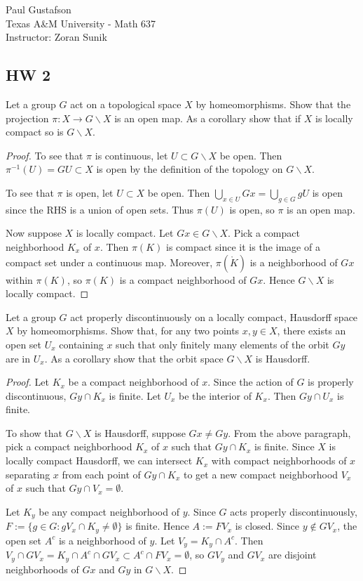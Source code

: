 \documentclass{article}
\begin{document}
\noindent Paul Gustafson\\
\noindent Texas A\&M University - Math 637\\ 
\noindent Instructor: Zoran Sunik

\subsection*{HW 2}
 Let a group $G$ act on a topological space $X$ by homeomorphisms.  Show that the projection $\pi: X \to G \backslash X$ is an open map.
 As a corollary show that  if $X$ is locally compact so is $G \backslash X$.
\begin{proof}
To see that $\pi$ is continuous, let $U \subset G \backslash X$ be open.  Then $\pi^{-1}(U) = GU \subset X$ is open by the definition of the topology on $G \backslash X$.

To see that $\pi$ is open, let $U \subset X$ be open.  Then $\bigcup_{x \in U} Gx = \bigcup_{g \in G} gU$ is open since the RHS is a union of open sets.  Thus $\pi(U)$ is open, so $\pi$ is an open map.

Now suppose $X$ is locally compact.  Let $Gx \in G \backslash X$.  Pick a compact neighborhood $K_x$ of $x$.  Then $\pi(K)$ is compact since it is the image of a compact set under a continuous map.  Moreover, $\pi(\mathring{K})$ is a neighborhood of $Gx$ within $\pi(K)$, so $\pi(K)$ is a compact neighborhood of $Gx$. Hence $G \backslash X$ is locally compact.
\end{proof}

 Let a group $G$ act properly discontinuously on a locally compact, Hausdorff space $X$ by homeomorphisms.  Show that, for any two points $x, y \in X$, there exists an open set $U_x$ containing $x$ such that only finitely many elements of the orbit $Gy$ are in $U_x$.
As a corollary show that the orbit space $G \backslash X$ is Hausdorff.
\begin{proof}
Let $K_x$ be a compact neighborhood of $x$.   Since the action of $G$ is properly discontinuous, $Gy \cap K_x$ is finite.  Let $U_x$ be the interior of $K_x$.  Then $Gy \cap U_x$ is finite.

To show that $G \backslash X$ is Hausdorff, suppose $Gx \neq Gy$. From the above paragraph, pick a compact neighborhood $K_x$ of $x$ such that $Gy \cap K_x$ is finite.  Since $X$ is locally compact Hausdorff, we can intersect $K_x$ with compact neighborhoods of $x$ separating $x$ from each point of $Gy \cap K_x$ to get a new compact neighborhood $V_x$ of $x$ such that $Gy \cap V_x = \emptyset$. 

Let $K_y$ be any compact neighborhood of $y$.  Since $G$ acts properly discontinuously, $F := \{g \in G : gV_x \cap K_y \neq \emptyset \}$ is finite. Hence $A := FV_x$ is closed.  Since $y \not\in GV_x$, the open set $A^c$ is a neighborhood of $y$. Let $V_y = K_y \cap A^c$.  Then $V_y \cap GV_x = K_y \cap A^c \cap GV_x \subset A^c \cap FV_x = \emptyset$, so $GV_y$ and $GV_x$ are disjoint neighborhoods of $Gx$ and $Gy$ in $G \backslash X$.
\end{proof}
\end{document}
